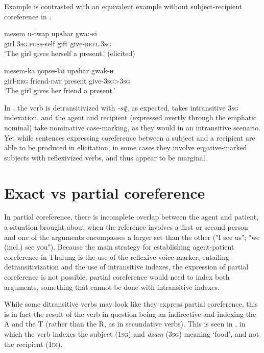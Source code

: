 \documentclass[output=paper]{langscibook}
\begin{document}
Example  is contrasted with an equivalent example without subject-recipient coreference in .

\ea
\label{ex:Lahaussois:41}
    \ea
    \label{ex:Lahaussois:41a}
    \gll mesem u-twap upʌhar gwa:-si\\
        girl \textsc{3sg.poss}{}-self gift give-\textsc{refl.3sg}\\
    \glt ‘The girl gives herself a present.' (elicited)
    
    \ex
    \label{ex:Lahaussois:41b}
    \gll mesem-ka ŋopsɵ-lai upʌhar gwak-ʉ\\
    girl-\textsc{erg} friend-\textsc{dat} present give-\textsc{3sg>3sg}\\
    \glt ‘The girl gives her friend a present.'
\z
\z

In , the verb is detransitivized with \textit{{}-siʈ}, as expected, takes intransitive 3\textsc{sg} indexation, and the agent and recipient (expressed overtly through the emphatic nominal) take nominative case-marking, as they would in an intransitive scenario. Yet while sentences expressing coreference between a subject and a recipient are able to be produced in elicitation, in some cases they involve ergative-marked subjects with reflexivized verbs, and thus appear to be marginal. 

\section{Exact vs partial coreference}
\label{sec:Lahaussois:6}

In partial coreference, there is incomplete overlap between the agent and patient, a situation brought about when the reference involves a first or second person and one of the arguments encompasses a larger set than the other ("I see us"; "we (incl.) see you"). Because the main strategy for establishing agent-patient coreference in Thulung is the use of the reflexive voice marker, entailing detransitivization and the use of intransitive indexes, the expression of partial coreference is not possible: partial coreference would need to index both arguments, something that cannot be done with intransitive indexes.

  While some ditransitive verbs may look like they express partial coreference, this is in fact the result of the verb in question being an indirective and indexing the A and the T (rather than the R, as in secundative verbs). This is seen in , in which the verb indexes the subject (1\textsc{sg}) and \textit{dzam} (3\textsc{sg}) meaning ‘food', and not the recipient (1\textsc{di}).
\end{document}
